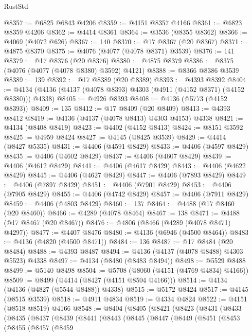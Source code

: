 \begin{lexlean}{RustStd}
\begin{coremodule}
@8357 := @6825 @6843 @4206
@8359 := @4151 @8357 @4166
@8361 := @6823 @8359 @4206
@8362 := @4414 @8361
@8364 := @3536 (@8355 @8362)
@8366 := @4069 (@4072 @626)
@8367 := 140
@8370 := @17 @8367 (@20 @8367)
@8371 := @4875 @8370
@8375 := @4076 (@4077 (@4078 @8371) @3539)
@8376 := 141
@8379 := @17 @8376 (@20 @8376)
@8380 := @4875 @8379
@8386 := @8375 (@4076 (@4077 (@4078 @8380) @3592) @4121)
@8388 := @8366 @8386 @3539
@8389 := 139
@8392 := @17 @8389 (@20 @8389)
@8393 := @4393 @8392
@8404 := @4134 (@4136 (@4137 (@4078 @8393) @4303 (@4911 (@4152 @8371) (@4152 @8380))) @4338)
@8405 := @4926 @8393
@8408 := @4136 (@5773 (@4152 @8393))
@8409 := 135
@8412 := @17 @8409 (@20 @8409)
@8413 := @4393 @8412
@8419 := @4136 (@4137 (@4078 @8413) @4303 @4153) @4338
@8421 := @4134 (@8408 @8419)
@8423 := @4402 (@4152 @8413)
@8424 := @8151 @3592
@8425 := @4959 @8424
@8427 := @4145 (@8425 @3539)
@8429 := @4414 (@8427 @5335)
@8431 := @4406 (@4591 @8429)
@8433 := @4406 (@4597 @8429)
@8435 := @4406 (@4602 @8429)
@8437 := @4406 (@4607 @8429)
@8439 := @4406 (@4612 @8429)
@8441 := @4406 (@4617 @8429)
@8443 := @4406 (@4622 @8429)
@8445 := @4406 (@4627 @8429)
@8447 := @4406 (@7893 @8429)
@8449 := @4406 (@7897 @8429)
@8451 := @4406 (@7901 @8429)
@8453 := @4406 (@7905 @8429)
@8455 := @4406 (@4742 @8429)
@8457 := @4406 (@7911 @8429)
@8459 := @4406 (@4803 @8429)
@8460 := 137
@8464 := @4488 (@17 @8460 (@20 @8460))
@8466 := @4289 (@4078 @8464)
@8467 := 138
@8471 := @4488 (@17 @8467 (@20 @8467))
@8476 := @4806 (@8466 (@4289 (@4078 @8471) @4297))
@8477 := @4407 @8476
@8480 := @4136 (@6946 (@4500 @8464))
@8483 := @4136 (@4820 (@4500 @8471))
@8484 := 136
@8487 := @17 @8484 (@20 @8484)
@8488 := @4393 @8487
@8494 := @4136 (@4137 (@4078 @8488) @4303 @5523) @4338
@8497 := @4134 (@8480 (@8483 @8494))
@8498 := @5529 @8488
@8499 := @5140 @8498
@8504 := @5708 (@8060 (@4151 (@4769 @4834) @4166))
@8509 := @8499 (@4414 (@8427 (@4151 @8504 @4166)))
@8514 := @4134 (@4136 (@4827 (@5544 @8488)) @4338)
@8515 := @5172 @8424
@8517 := @4145 (@8515 @3539)
@8518 := @4911 @4834
@8519 := @4334 @4824
@8522 := @4151 (@8518 @8519) @4166
@8548 := @8404
    (@8405
      (@8421
        (@8423
          (@8431
            (@8433
              (@8435
                (@8437
                  (@8439
                    (@8441
                      (@8443
                        (@8445
                          (@8447
                            (@8449
                              (@8451
                                (@8453
                                  (@8455
                                    (@8457
                                      (@8459

\end{coremodule}
\end{lexlean}
